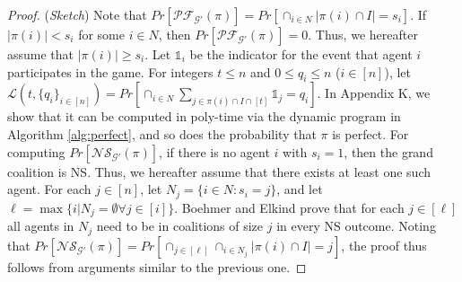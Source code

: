 \documentclass[letterpaper]{article} %
\begin{document}
\begin{proof}
(\textit{Sketch}) Note that $Pr[\mathcal{PF}_{\mathcal{G}'}(\pi)] = Pr[\cap_{i \in N} |\pi(i) \cap I| = s_i]$. %
If $|\pi(i)| < s_i$ for some $i \in N$, then $Pr[\mathcal{PF}_{\mathcal{G}'}(\pi)] = 0$. Thus, we hereafter assume that $|\pi(i)| \geq s_i$. Let $\mathds{1}_i$ be the indicator for the event that agent $i$ participates in the game. For integers $t \leq n$ and $0 \leq q_i \leq n$ ($i \in [n]$), let $\mathcal{L}(t,\{q_i\}_{i \in [n]}) = Pr[\cap_{i \in N} \sum_{j \in \pi(i) \cap I \cap [t]} \mathds{1}_j = q_i]$. In Appendix K, we show that it can be computed in poly-time via the dynamic program in Algorithm \ref{alg:perfect}, and so does the probability that $\pi$ is perfect.  %
For computing $Pr[\mathcal{NS}_{\mathcal{G}'}(\pi)]$, if there is no agent $i$ with $s_i = 1$, then the grand coalition is NS. Thus, we hereafter assume that there exists at least one such agent. For each $j \in [n]$, let $N_j = \{i \in N : s_i = j\}$, and let $\ell = \max\{i | N_j = \emptyset \forall j \in [i]\}$. Boehmer and Elkind  prove that for each $j \in [\ell]$ all agents in $N_j$ need to be in coalitions of size $j$ in every NS outcome. Noting that $Pr[\mathcal{NS}_{\mathcal{G}'}(\pi)] = Pr[\cap_{j \in [\ell]} \cap_{i \in N_j} |\pi(i) \cap I| = j]$, the proof thus follows from arguments similar to the previous one.
\end{proof}
\end{document}

